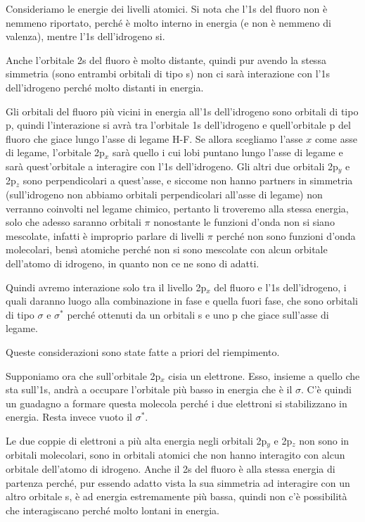 Consideriamo le energie dei livelli atomici. Si nota che l'1s del fluoro non è nemmeno riportato, perché è molto interno in energia (e non è nemmeno di valenza), mentre l'1s dell'idrogeno si.

Anche l'orbitale 2s del fluoro è molto distante, quindi pur avendo la stessa simmetria (sono entrambi orbitali di tipo s) non ci sarà interazione con l'1s dell'idrogeno perché molto distanti in energia.

Gli orbitali del fluoro più vicini in energia all'1s dell'idrogeno sono orbitali di tipo p, quindi l'interazione si avrà tra l'orbitale 1s dell'idrogeno e quell'orbitale p del fluoro che giace lungo l'asse di legame H-F. Se allora scegliamo l'asse $x$ come asse di legame, l'orbitale 2p$_x$ sarà quello i cui lobi puntano lungo l'asse di legame e sarà quest'orbitale a interagire con l'1s dell'idrogeno. Gli altri due orbitali 2p$_y$ e 2p$_z$ sono perpendicolari a quest'asse, e siccome non hanno partners in simmetria (sull'idrogeno non abbiamo orbitali perpendicolari all'asse di legame) non verranno coinvolti nel legame chimico, pertanto li troveremo alla stessa energia, solo che adesso saranno orbitali $\pi$ nonostante le funzioni d'onda non si siano mescolate, infatti è improprio parlare di livelli $\pi$ perché non sono funzioni d'onda molecolari, bensì atomiche perché non si sono mescolate con alcun orbitale dell'atomo di idrogeno, in quanto non ce ne sono di adatti.

Quindi avremo interazione solo tra il livello 2p$_x$ del fluoro e l'1s dell'idrogeno, i quali daranno luogo alla combinazione in fase e quella fuori fase, che sono orbitali di tipo $\sigma$ e $\sigma^*$ perché ottenuti da un orbitali s e uno p che giace sull'asse di legame.

\vspace{0.2cm}Queste considerazioni sono state fatte a priori del riempimento.

Supponiamo ora che sull'orbitale 2p$_x$ cisia un elettrone. Esso, insieme a quello che sta sull'1s, andrà a occupare l'orbitale più basso in energia che è il $\sigma$. C'è quindi un guadagno a formare questa molecola perché i due elettroni si stabilizzano in energia. Resta invece vuoto il $\sigma^*$.

Le due coppie di elettroni a più alta energia negli orbitali 2p$_y$ e 2p$_z$ non sono in orbitali molecolari, sono in orbitali atomici che non hanno interagito con alcun orbitale dell'atomo di idrogeno. Anche il 2s del fluoro è alla stessa energia di partenza perché, pur essendo adatto vista la sua simmetria ad interagire con un altro orbitale s, è ad energia estremamente più bassa, quindi non c'è possibilità che interagiscano perché molto lontani in energia.

